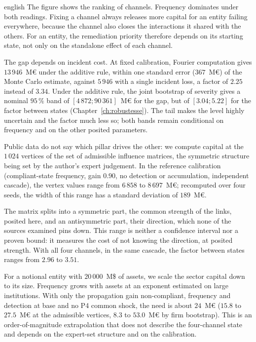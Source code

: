 \begin{otherlanguage*}{english}
The figure shows the ranking of channels. Frequency dominates under both readings. Fixing a channel
always releases more capital for an entity failing everywhere, because the channel also closes the
interactions it shared with the others. For an entity, the remediation priority therefore depends on
its starting state, not only on the standalone effect of each channel.

The gap depends on incident cost. At fixed calibration, Fourier computation gives
$13\,946$~M\euro{} under the additive rule, within one standard error ($367$~M\euro) of the
Monte Carlo estimate, against $5\,946$ with a single incident loss, a factor of $2.25$ instead of $3.34$. Under
the additive rule, the joint bootstrap of severity gives a nominal $95\,\%$ band of
$[4\,872;90\,361]$~M\euro{} for the gap, but of $[3.04;5.22]$ for the factor between states
(Chapter~\ref{ch:robustesse}). The tail makes the level highly uncertain and the factor much less
so; both bands remain conditional on frequency and on the other posited parameters.

Public data do not say which pillar drives the other: we compute capital at the $1\,024$
vertices of the set of admissible influence matrices, the symmetric structure being set by the author's expert
judgement. In the reference calibration (compliant-state frequency, gain $0.90$, no detection or accumulation, independent cascade),
the vertex values range from $6\,858$ to $8\,697$~M\euro; recomputed over four seeds, the width
of this range has a standard deviation of $189$~M\euro.

The matrix splits into a symmetric part,
the common strength of the links, posited here, and an antisymmetric part, their
direction, which none of the sources examined pins down. This range is neither a confidence interval
nor a proven bound: it measures the cost of not knowing the direction, at posited strength. With all four channels, in the same cascade, the factor between states ranges from $2.96$ to $3.51$.

For a notional entity with $20\,000$~M\$ of assets, we scale the sector capital down to its size.
Frequency grows with assets at an exponent estimated on large institutions. With only the propagation gain non-compliant,
frequency and detection at base and no P4 common shock, the need is about $24$~M\euro{} ($15.8$ to $27.5$~M\euro{} at the admissible vertices, $8.3$
to $53.0$~M\euro{} by firm bootstrap). This is an order-of-magnitude extrapolation that does not describe the four-channel state and depends on
the expert-set structure and on the calibration.


\end{otherlanguage*}
